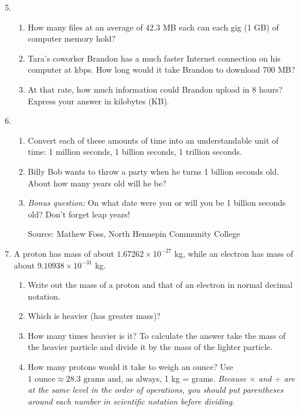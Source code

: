 \begin{enumerate} 
\setcounter{enumi}{4}

\item \begin{enumerate}
\item How many files at an average of 42.3 MB each can each gig (1 GB) of computer memory hold?
\item Tara's coworker Brandon has a much faster Internet connection on his computer at  kbps.  How long would it take Brandon to download 700 MB?  
\item At that rate, how much information could Brandon upload in 8 hours?  Express your answer in kilobytes (KB).
\end{enumerate}

\item \begin{enumerate}
\item Convert each of these amounts of time into an understandable unit of time: 1 million seconds, 1 billion seconds, 1 trillion seconds. 
\item Billy Bob wants to throw a party when he turns 1 billion seconds old. About how many years old will he be?
\item \emph{Bonus question:}  On what date were you or will you be 1 billion seconds old?  Don't forget leap years! \hfill \begin{footnotesize} Source:  Mathew Foss, North Hennepin Community College \end{footnotesize} %
\end{enumerate}  

\item  A proton has mass of about $1.67262 \times 10^{-27}$ kg, while an electron has mass of about $9.10938 \times 10^{-31}$ kg. 
\begin{enumerate}
\item Write out the mass of a proton and that of an electron in normal decimal notation.
\item Which is heavier (has greater mass)?
\item How many times heavier is it?  To calculate the answer take the mass of the heavier particle and divide it by the mass of the lighter particle.
\item How many protons would it take to weigh an ounce? Use 
$1 \text{ ounce} \approx 28.3 \text{ grams}$
and, as always, 1 kg =  grams.
\emph{Because $\times$ and $\div$ are at the same level in the order of operations, you should put parentheses around each number in scientific notation before dividing.}
\end{enumerate} %


\end{enumerate}
